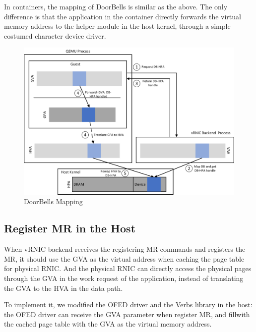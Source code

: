  In containers, the mapping of DoorBells is similar as the above. The only difference is that the application in the container directly forwards the virtual memory address to the helper module in the host kernel, through a simple costumed  character device driver. 
 \begin{figure}[!ht]
	\centering
	\includegraphics[width=1\linewidth]{images/db-map.png}
	\caption{DoorBells Mapping}
	\label{fig:db-map}
\end{figure}
 

\subsection{Register MR in the Host}
When vRNIC backend receives the registering MR commands and registers the MR, it should use the GVA as the virtual address when caching the page table for physical RNIC. And the physical RNIC can directly access the physical pages through the GVA in the work request of the application, instead of translating the GVA to the HVA in the data path. 

To implement it, we modified the OFED driver and the Verbs library in the host: the OFED driver can receive the GVA parameter when register MR, and fillwith the cached page table with the GVA as the virtual memory address.



